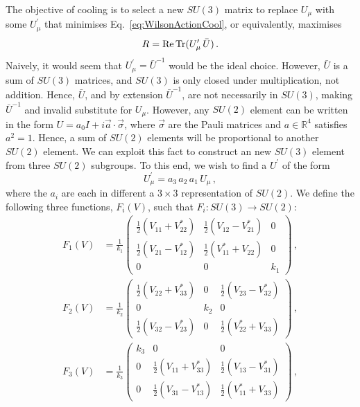 The objective of cooling is to select a new $SU(3)$ matrix to replace $U_\mu$ with some $U_\mu^\prime$ that minimises Eq.~\ref{eq:WilsonActionCool}, or equivalently, maximises
%
\begin{equation}
R = \operatorname{Re} \operatorname{Tr} (U_\mu^\prime \, \bar{U})\, .
\label{eq:CoolFunctional}
\end{equation}
%
Naively, it would seem that $U_\mu^\prime = \bar{U}^{-1}$ would be the ideal choice. However, $\bar{U}$ is a sum of $SU(3)$ matrices, and $SU(3)$ is only closed under multiplication, not addition. Hence, $\bar{U}$, and by extension $\bar{U}^{-1}$, are not necessarily in $SU(3)$, making $\bar{U}^{-1}$ and invalid substitute for $U_\mu$. However, any $SU(2)$ element can be written in the form $U = a _ { 0 } I + i \vec { a } \cdot \vec { \sigma }$, where $\vec{\sigma}$ are the Pauli matrices and $a\in\mathbb{R}^4$  satisfies $a^2=1$. Hence, a sum of $SU(2)$ elements will be proportional to another $SU(2)$ element. We can exploit this fact to construct an new $SU(3)$ element from three $SU(2)$ subgroups. To this end, we wish to find a $U^\prime$ of the form
%
\begin{equation}
U^\prime_\mu = a_3\,a_2\,a_1\,U_\mu\, ,
\label{eq:UPrime}
\end{equation}
%
where the $a_i$ are each in different a $3\times 3$ representation of $SU(2)$. We define the following three functions, $F_i(V)$, such that $F_i : SU(3)\rightarrow SU(2)$:
%
\begin{align*}
F_1(V) &=\frac{1}{k_1} \begin{pmatrix}
\frac{1}{2}\left(V_{11} + V_{22}^*\right) & \frac{1}{2}\left(V_{12} - V_{21}^*\right) & 0\\
\frac{1}{2}\left(V_{21} - V_{12}^*\right) & \frac{1}{2}\left(V_{11}^* + V_{22}\right) & 0\\
0 & 0 & k_1
\end{pmatrix}\, ,\\
F_2(V) &=\frac{1}{k_2} \begin{pmatrix}
\frac{1}{2}\left(V_{22} + V_{33}^*\right) & 0 &\frac{1}{2}\left(V_{23} - V_{32}^*\right)\\
0 & k_2 & 0\\
\frac{1}{2}\left(V_{32} - V_{23}^*\right) & 0 & \frac{1}{2}\left(V_{22}^* + V_{33}\right)
\end{pmatrix}\, ,\\
F_3(V) &=\frac{1}{k_3} \begin{pmatrix}
k_3 & 0 & 0\\
0 & \frac{1}{2}\left(V_{11} + V_{33}^*\right) & \frac{1}{2}\left(V_{13} - V_{31}^*\right)\\
0 & \frac{1}{2}\left(V_{31} - V_{13}^*\right) & \frac{1}{2}\left(V_{11}^* + V_{33}\right)
\end{pmatrix}\, ,
\end{align*}
